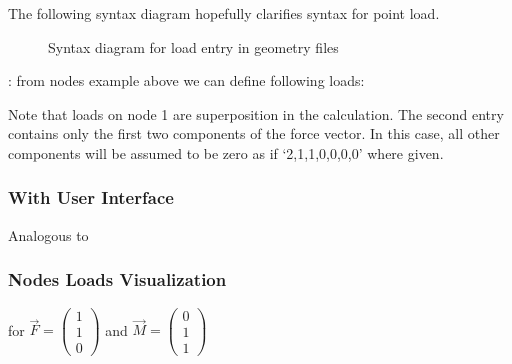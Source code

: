 \documentclass[letterpaper,10pt,english]{sphinxmanual}
\begin{document}
The following syntax diagram hopefully clarifies syntax for point load.

\begin{figure}[htbp]
\centering
\capstart

\noindent{}
\caption{Syntax diagram for load entry in geometry files}\label{\detokenize{making_a_model:id20}}\end{figure}

:
from nodes example above we can define following loads:

\begin{sphinxVerbatim}[commandchars=\\\{\}]
 
 
\end{sphinxVerbatim}

Note that loads on node 1 are superposition in the calculation.
The second entry contains only the first two components of the force vector.
In this case, all other components will be assumed to be zero as if ‘2,1,1,0,0,0,0’ where given.


\subsubsection{With User Interface}
\label{\detokenize{making_a_model:id10}}
Analogous to {\hyperref[\detokenize{making_a_model:nodes-input}]{}}


\subsubsection{Nodes Loads Visualization}
\label{\detokenize{making_a_model:nodes-loads-visualization}}
for \(\vec{F}= \left(\begin{array}{c} 1 \\ 1 \\ 0 \end{array}\right)\) and
\(\vec{M}= \left(\begin{array}{c} 0 \\ 1 \\ 1 \end{array}\right)\)
\end{document}
